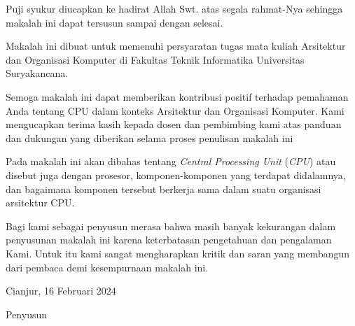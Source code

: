 Puji syukur diucapkan ke hadirat Allah Swt. atas segala rahmat-Nya sehingga
makalah ini dapat tersusun sampai dengan selesai.

Makalah ini dibuat untuk memenuhi persyaratan tugas mata kuliah Arsitektur dan
Organisasi Komputer di Fakultas Teknik Informatika Universitas Suryakancana.

Semoga makalah ini dapat memberikan kontribusi positif
terhadap pemahaman Anda tentang CPU dalam konteks Arsitektur dan Organisasi Komputer.
Kami mengucapkan terima kasih kepada dosen dan pembimbing kami atas panduan dan dukungan
yang diberikan selama proses penulisan makalah ini

Pada makalah ini akan dibahas tentang \textit{Central Processing Unit} (\textit{CPU})
atau disebut juga dengan prosesor, komponen-komponen yang terdapat didalamnya,
dan bagaimana komponen tersebut berkerja sama dalam suatu organisasi arsitektur CPU.

Bagi kami sebagai penyusun merasa bahwa masih banyak kekurangan dalam
penyusunan makalah ini karena keterbatasan pengetahuan dan pengalaman Kami.
Untuk itu kami sangat mengharapkan kritik dan saran yang membangun dari
pembaca demi kesempurnaan makalah ini.

\vspace{1cm}

\begin{center}
  \begin{flushright}
    Cianjur, 16 Februari 2024

    Penyusun
  \end{flushright}
\end{center}
